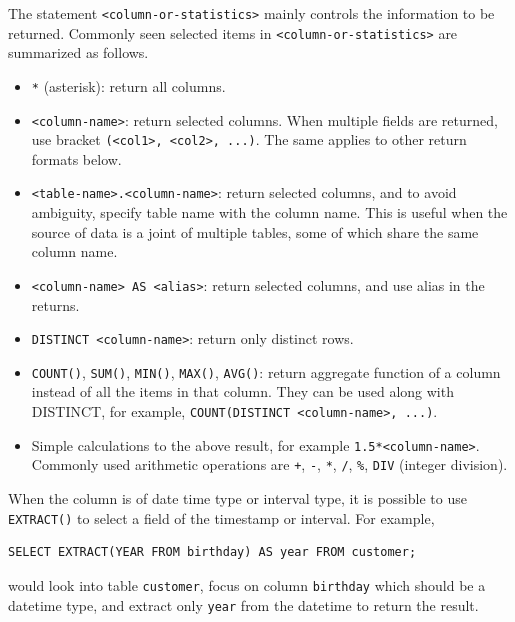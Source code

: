 The statement \verb|<column-or-statistics>| mainly controls the information to be returned. Commonly seen selected items in \verb|<column-or-statistics>| are summarized as follows.
\begin{itemize}
  \item \verb|*| (asterisk): return all columns.
  \item \verb|<column-name>|: return selected columns.  When multiple fields are returned, use bracket \verb|(<col1>, <col2>, ...)|. The same applies to other return formats below.
  \item \verb|<table-name>.<column-name>|: return selected columns, and to avoid ambiguity, specify table name with the column name. This is useful when the source of data is a joint of multiple tables, some of which share the same column name.
  \item \verb|<column-name> AS <alias>|: return selected columns, and use alias in the returns.
  \item \verb|DISTINCT <column-name>|: return only distinct rows.
  \item \verb|COUNT()|, \verb|SUM()|, \verb|MIN()|, \verb|MAX()|, \verb|AVG()|: return aggregate function of a column instead of all the items in that column. They can be used along with DISTINCT, for example, \verb|COUNT(DISTINCT <column-name>, ...)|.
  \item Simple calculations to the above result, for example \verb|1.5*<column-name>|. Commonly used arithmetic operations are \verb|+|, \verb|-|, \verb|*|, \verb|/|, \verb|%|, \verb|DIV| (integer division).
\end{itemize}
When the column is of date time type or interval type, it is possible to use \verb|EXTRACT()| to select a field of the timestamp or interval. For example,
\begin{lstlisting}
SELECT EXTRACT(YEAR FROM birthday) AS year FROM customer; 
\end{lstlisting}
would look into table \verb|customer|, focus on column \verb|birthday| which should be a datetime type, and extract only \verb|year| from the datetime to return the result. 


